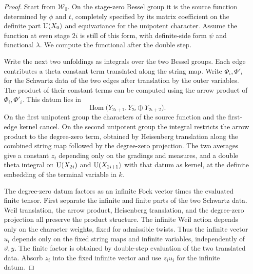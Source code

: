 \begin{proof}
Start from $\mathcal W_0$. On the stage-zero Bessel group it is the source function determined by $\phi$ and $t$, completely specified by its matrix coefficient on the definite part $\operatorname{U}(X_0)$ and equivariance for the unipotent character. Assume the function at even stage $2i$ is still of this form, with definite-side form $\psi$ and functional $\lambda$. We compute the functional after the double step.

Write the next two unfoldings as integrals over the two Bessel groups. Each edge contributes a theta constant term translated along the string map. Write $\Phi_i,\Phi'_i$ for the Schwartz data of the two edges after translation by the outer variables. The product of their constant terms can be computed using the arrow product of $\Phi_i,\Phi'_i$. This datum lies in
\[
 \operatorname{Hom}\bigl(Y_{2i+1},Y_{2i}^{-}\oplus Y_{2i+2}\bigr).
\]
On the first unipotent group the characters of the source function and the first-edge kernel cancel. On the second unipotent group the integral restricts the arrow product to the degree-zero term, obtained by Heisenberg translation along the combined string map followed by the degree-zero projection. The two averages give a constant $z_i$ depending only on the gradings and measures, and a double theta integral on $\operatorname{U}(X_{2i})$ and $\operatorname{U}(X_{2i+1})$ with that datum as kernel, at the definite embedding of the terminal variable in $k$.

The degree-zero datum factors as an infinite Fock vector times the evaluated finite tensor. First separate the infinite and finite parts of the two Schwartz data. Weil translation, the arrow product, Heisenberg translation, and the degree-zero projection all preserve the product structure. The infinite Weil action depends only on the character weights, fixed for admissible twists. Thus the infinite vector $u_i$ depends only on the fixed string maps and infinite variables, independently of $\vartheta,y$. The finite factor is obtained by double-step evaluation of the two translated data. Absorb $z_i$ into the fixed infinite vector and use $z_i u_i$ for the infinite datum.


\end{proof}
